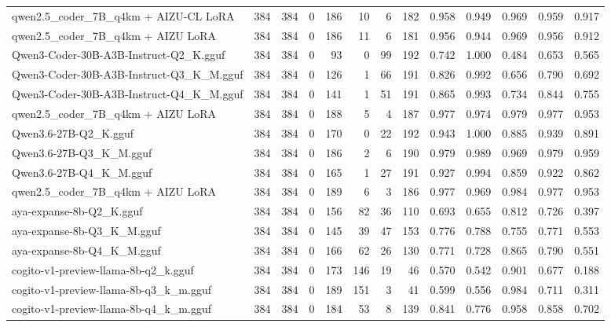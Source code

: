 \begin{table}[htbp]
{\begin{tabular}{lrrrrrrrrrrrr}
    qwen2.5\_coder\_7B\_q4km + AIZU-CL LoRA & 384 & 384 & 0 & 186 & 10 & 6 & 182 & 0.958 & 0.949 & 0.969 & 0.959 & 0.917 \\
    qwen2.5\_coder\_7B\_q4km + AIZU LoRA & 384 & 384 & 0 & 186 & 11 & 6 & 181 & 0.956 & 0.944 & 0.969 & 0.956 & 0.912 \\
    Qwen3-Coder-30B-A3B-Instruct-Q2\_K.gguf & 384 & 384 & 0 & 93 & 0 & 99 & 192 & 0.742 & 1.000 & 0.484 & 0.653 & 0.565 \\
    Qwen3-Coder-30B-A3B-Instruct-Q3\_K\_M.gguf & 384 & 384 & 0 & 126 & 1 & 66 & 191 & 0.826 & 0.992 & 0.656 & 0.790 & 0.692 \\
    Qwen3-Coder-30B-A3B-Instruct-Q4\_K\_M.gguf & 384 & 384 & 0 & 141 & 1 & 51 & 191 & 0.865 & 0.993 & 0.734 & 0.844 & 0.755 \\
    qwen2.5\_coder\_7B\_q4km + AIZU LoRA & 384 & 384 & 0 & 188 & 5 & 4 & 187 & 0.977 & 0.974 & 0.979 & 0.977 & \cellcolor{green!30}0.953 \\
    Qwen3.6-27B-Q2\_K.gguf & 384 & 384 & 0 & 170 & 0 & 22 & 192 & 0.943 & 1.000 & 0.885 & 0.939 & 0.891 \\
    Qwen3.6-27B-Q3\_K\_M.gguf & 384 & 384 & 0 & 186 & 2 & 6 & 190 & 0.979 & 0.989 & 0.969 & 0.979 & \cellcolor{green!50}0.959 \\
    Qwen3.6-27B-Q4\_K\_M.gguf & 384 & 384 & 0 & 165 & 1 & 27 & 191 & 0.927 & 0.994 & 0.859 & 0.922 & 0.862 \\
    qwen2.5\_coder\_7B\_q4km + AIZU LoRA & 384 & 384 & 0 & 189 & 6 & 3 & 186 & 0.977 & 0.969 & 0.984 & 0.977 & \cellcolor{green!40}0.953 \\
    aya-expanse-8b-Q2\_K.gguf & 384 & 384 & 0 & 156 & 82 & 36 & 110 & 0.693 & 0.655 & 0.812 & 0.726 & 0.397 \\
    aya-expanse-8b-Q3\_K\_M.gguf & 384 & 384 & 0 & 145 & 39 & 47 & 153 & 0.776 & 0.788 & 0.755 & 0.771 & 0.553 \\
    aya-expanse-8b-Q4\_K\_M.gguf & 384 & 384 & 0 & 166 & 62 & 26 & 130 & 0.771 & 0.728 & 0.865 & 0.790 & 0.551 \\
    cogito-v1-preview-llama-8b-q2\_k.gguf & 384 & 384 & 0 & 173 & 146 & 19 & 46 & 0.570 & 0.542 & 0.901 & 0.677 & 0.188 \\
    cogito-v1-preview-llama-8b-q3\_k\_m.gguf & 384 & 384 & 0 & 189 & 151 & 3 & 41 & 0.599 & 0.556 & 0.984 & 0.711 & 0.311 \\
    cogito-v1-preview-llama-8b-q4\_k\_m.gguf & 384 & 384 & 0 & 184 & 53 & 8 & 139 & 0.841 & 0.776 & 0.958 & 0.858 & 0.702 \\

\end{tabular}}
\end{table}
